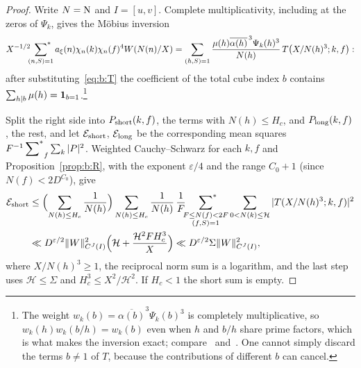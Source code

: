 \begin{proof}
Write $N=\mathrm{N}$ and $I=[u,v]$. Complete multiplicativity, including at the zeros of $\Psi_k$, gives the M\"obius inversion
\begin{equation}\label{eq:b:cubeinverse}
  X^{-1/2}\sideset{}{^*}\sum_{(n,S)=1}a_\xi(n)\chi_n(k)\chi_n(f)^4W(N(n)/X)=\sum_{(h,S)=1}\frac{\mu(h)\overline{\alpha(h)}^{\,3}\Psi_k(h)^3}{N(h)}\,T\bigl(X/N(h)^3;k,f\bigr):
\end{equation}
after substituting~\eqref{eq:b:T} the coefficient of the total cube index $b$ contains $\sum_{h\mid b}\mu(h)=\mathbf{1}_{b=1}$.\footnote{The weight $w_k(b)=\overline{\alpha(b)}^3\Psi_k(b)^3$ is completely multiplicative, so $w_k(h)w_k(b/h)=w_k(b)$ even when $h$ and $b/h$ share prime factors, which is what makes the inversion exact; compare~\cite[(1.18)]{IK04} and~\cite[(8.2)]{DR}. One cannot simply discard the terms $b\ne1$ of $T$, because the contributions of different $b$ can cancel.}

Split the right side into $P_{\rm short}(k,f)$, the terms with $N(h)\le H_c$, and $P_{\rm long}(k,f)$, the rest, and let $\mathcal{E}_{\rm short}$, $\mathcal{E}_{\rm long}$ be the corresponding mean squares $F^{-1}\sideset{}{^*}\sum_f\sum_k|P|^2$. Weighted Cauchy--Schwarz for each $k,f$ and Proposition~\ref{prop:b:R}, with the exponent $\varepsilon/4$ and the range $C_0+1$ (since $N(f)<2D^{C_0}$), give
\begin{equation}\label{eq:b:shortcube}
\begin{aligned}
  \mathcal{E}_{\rm short}&\le\Bigl(\sum_{N(h)\le H_c}\frac1{N(h)}\Bigr)\sum_{N(h)\le H_c}\frac1{N(h)}\,\frac1F\sideset{}{^*}\sum_{\substack{F\le N(f)<2F\\(f,S)=1}}\sum_{0<N(k)\le\mathcal H}|T(X/N(h)^3;k,f)|^2\\
  &\ll D^{\varepsilon/2}\|W\|^2_{C^J(I)}\Bigl(\mathcal H+\frac{\mathcal H^2FH_c^3}X\Bigr)\ll D^{\varepsilon/2}\Sigma\|W\|^2_{C^J(I)},
\end{aligned}
\end{equation}
where $X/N(h)^3\ge1$, the reciprocal norm sum is a logarithm, and the last step uses $\mathcal H\le\Sigma$ and $H_c^3\le X^2/\mathcal H^2$. If $H_c<1$ the short sum is empty.


\end{proof}

